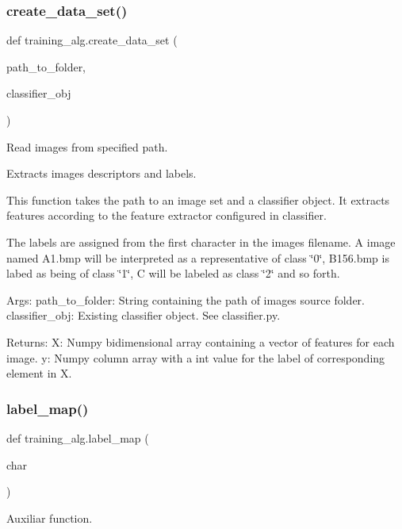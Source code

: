 \subsubsection{\texorpdfstring{create\+\_\+data\+\_\+set()}{create\_data\_set()}}
{\footnotesize\ttfamily def training\+\_\+alg.\+create\+\_\+data\+\_\+set (\begin{DoxyParamCaption}\item[{}]{path\+\_\+to\+\_\+folder,  }\item[{}]{classifier\+\_\+obj }\end{DoxyParamCaption})}



Read images from specified path. 

Extracts images descriptors and labels.

This function takes the path to an image set and a classifier object. It extracts features according to the feature extractor configured in classifier.

The labels are assigned from the first character in the images filename. A image named A1.\+bmp will be interpreted as a representative of class \char`\"{}0\char`\"{}, B156.\+bmp is labed as being of class \char`\"{}1\char`\"{}, C will be labeled as class \char`\"{}2\char`\"{} and so forth.

Args\+: path\+\_\+to\+\_\+folder\+: String containing the path of images source folder. classifier\+\_\+obj\+: Existing classifier object. See classifier.\+py.

Returns\+: X\+: Numpy bidimensional array containing a vector of features for each image. y\+: Numpy column array with a int value for the label of corresponding element in X. \mbox{\label{namespacetraining__alg_a1b1bb425cd94ca0358c835ae1968470b}} 
\subsubsection{\texorpdfstring{label\+\_\+map()}{label\_map()}}
{\footnotesize\ttfamily def training\+\_\+alg.\+label\+\_\+map (\begin{DoxyParamCaption}\item[{}]{char }\end{DoxyParamCaption})}



Auxiliar function. 

